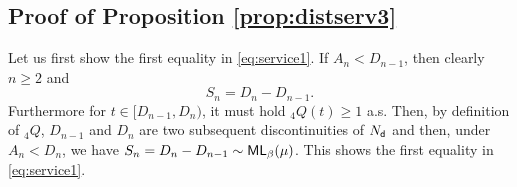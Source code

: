 \documentclass[]{amsart}
\numberwithin{equation}{section}
\theoremstyle{remark}
\theoremstyle{definition}
\begin{document}
\subsection{Proof of Proposition \ref{prop:distserv3}}\label{sec:restlessproof1}
	Let us first show the first equality in \eqref{eq:service1}. If $A_n<D_{n-1}$, then clearly $n \ge 2$ and
	\begin{equation*}
		S_n=D_n-D_{n-1}.	
	\end{equation*}
	Furthermore for $t \in [D_{n-1},D_n)$, it must hold ${}_4Q(t) \ge 1$ a.s. Then, by definition of ${}_4Q$, $D_{n-1}$ and $D_n$ are two subsequent discontinuities of $N_{\sf d}$ and then, under $A_n<D_n$, we have $S_n=D_n-D_{n-1} \sim {\sf ML}_\beta(\mu)$. This shows the first equality in \eqref{eq:service1}.
	
\end{document}
